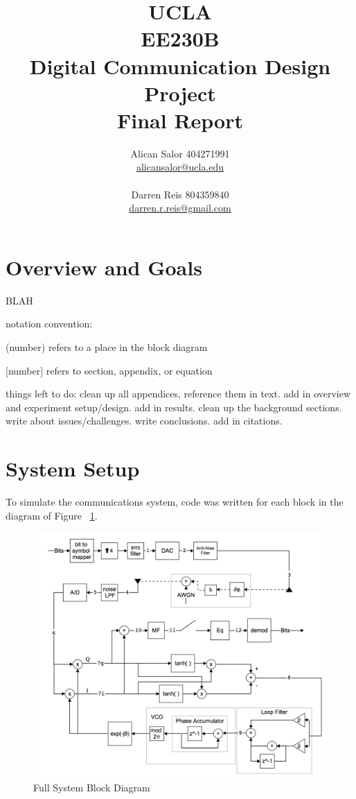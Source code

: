 \documentclass[]{article}
\title{UCLA\\EE230B\\Digital Communication Design Project\\Final Report}
\author{Alican Salor 404271991 \\  \href{mailto:alicansalor@ucla.edu}{alicansalor@ucla.edu} \\ \\
Darren Reis 804359840 \\
\href{mailto:darrer.r.reis@gmail.com}{darren.r.reis@gmail.com} }
\begin{document}
\maketitle

\newpage
\tableofcontents
\newpage
\section{Overview and Goals}
\label{sec:overview}
BLAH

notation convention:

(number) refers to a place in the block diagram

[number] refers to section, appendix, or equation

things left to do:  clean up all appendices, reference them in text.  add in overview and experiment setup/design.  add in results.  clean up the background sections.  write about issues/challenges.  write conclusions.  add in citations.

\section{System Setup}
\label{sec:}
To simulate the communications system, code was written for each block in the diagram of Figure ~\ref{fig:system}.
 
\begin{figure}[H]
\centering
\includegraphics[width=\textwidth]{systemfinal.png}
\caption{Full System Block Diagram\label{fig:system}}
\end{figure}
\end{document}
